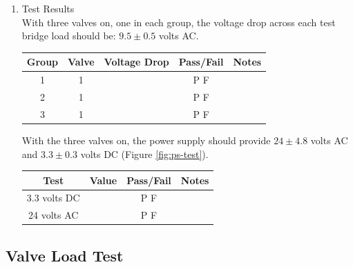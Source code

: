 \documentclass{article}
\begin{document}
\begin{enumerate}
\item Test Results \\
	\vspace{1em}
	With three valves on, one in each group, the voltage drop
	across each test bridge load should be: $9.5\pm0.5$ volts AC. \\
	\vspace{1em}
	\begin{tabular}{|c|c|c|c|c|}
		\hline
		Group & Valve	& Voltage Drop		& Pass/Fail & Notes \\
		\hline
		1 & 1 & & P \quad F & \hspace{20em} \\
		\hline
		2 & 1 && P \quad F & \\
		\hline
		3 & 1 && P \quad F & \\
		\hline
	\end{tabular}

	\vspace{1em}
	With the three valves on, the power supply should provide
	$24\pm4.8$ volts AC and $3.3\pm0.3$ volts DC (Figure \ref{fig:ps-test}). \\
	\vspace{1em}
	\begin{tabular}{|c|c|c|c|}
		\hline
		Test  & Value & Pass/Fail & Notes \\
		\hline
		3.3 volts DC & \hspace{5em} & P \quad F & \hspace{20em} \\
		\hline
		24 volts AC & & P \quad F & \\
		\hline
	\end{tabular}

\end{enumerate}

\clearpage
\subsection{Valve Load Test}
\end{document}
